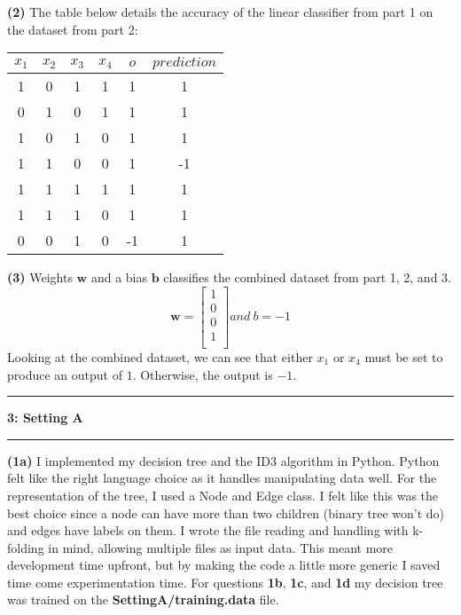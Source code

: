 \documentclass[11pt]{article}
\newcommand\question[2]{\vspace{.25in}\hrule\textbf{#1: #2}\vspace{.5em}\hrule\vspace{.10in}}
\renewcommand\part[1]{\vspace{.10in}\textbf{(#1)}}
\begin{document}
\part{2} The table below details the accuracy of the linear classifier from part 1 on the dataset from part 2:
 \begin{center}
    \begin{tabular}{cccc|c|c}
      $x_1$ & $x_2$ & $x_3$ & $x_4$ & $o$ & $prediction$\\ \hline
      1 & 0 & 1 & 1 & 1 & 1\\
      0 & 1 & 0 & 1 & 1 & 1\\
      1 & 0 & 1 & 0 & 1 & 1\\
      1 & 1 & 0 & 0 & 1 & -1\\
      1 & 1 & 1 & 1 & 1 & 1\\
      1 & 1 & 1 & 0 & 1 & 1\\
      0 & 0 & 1 & 0 & -1 & 1\\
    \end{tabular}
  \end{center}

\part{3} Weights $\mathbf{w}$ and a bias $\mathbf{b}$ classifies the combined dataset from part 1, 2, and 3.
$$
\mathbf{w} = \begin{bmatrix}
1 \\
0 \\
0 \\
1 \\ 	
\end{bmatrix}
 and \ b = -1
$$
Looking at the combined dataset, we can see that either $x_1$ or $x_4$ must be set to produce an output of $1$. Otherwise, the output is $-1$.

\question{3}{Setting A}

\part{1a} I implemented my decision tree and the ID3 algorithm in Python. Python felt like the right language choice as it handles manipulating data well. For the representation of the tree, I used a Node and Edge class. I felt like this was the best choice since a node can have more than two children (binary tree won't do) and edges have labels on them. I wrote the file reading and handling with k-folding in mind, allowing multiple files as input data. This meant more development time upfront, but by making the code a little more generic I saved time come experimentation time.
\newpage
For questions \textbf{1b}, \textbf{1c}, and \textbf{1d} my decision tree was trained on the \textbf{SettingA/training.data} file.
\end{document}
